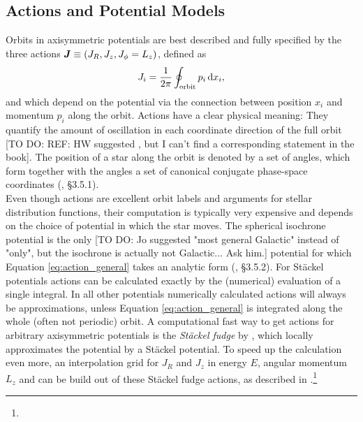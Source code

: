 \subsection{Actions and Potential Models}  \label{sec:potentials}


Orbits in axisymmetric potentials are best described and fully specified by the three actions $\boldsymbol{J} \equiv (J_R, J_z, J_\phi=L_z)$, defined as
\begin{equation}
J_i = \frac{1}{2\pi} \oint_\text{orbit} p_i \mathop{}\!\mathrm{d} x_i, \label{eq:action_general}
\end{equation}
and which depend on the potential via the connection between position $x_i$ and momentum $p_i$ along the orbit. Actions have a clear physical meaning: They quantify the amount of oscillation in each coordinate direction of the full orbit [TO DO: REF: HW suggested \citet{2008gady.book.....B}, but I can't find a corresponding statement in the book]. The position of a star along the orbit is denoted by a set of angles, which form together with the angles a set of canonical conjugate phase-space coordinates (\citealt{2008gady.book.....B}, \S 3.5.1). \\

Even though actions are excellent orbit labels and arguments for stellar distribution functions, their computation is typically very expensive and depends on the choice of potential in which the star moves. The spherical isochrone potential \citep{1959AnAp...22..126H} is the only [TO DO: Jo suggested "most general Galactic" instead of "only", but the isochrone is actually not Galactic... Ask him.] potential for which Equation \ref{eq:action_general} takes an analytic form (\citealt{2008gady.book.....B}, \S 3.5.2). For St\"{a}ckel potentials actions can be calculated exactly by the (numerical) evaluation of a single integral. In all other potentials numerically calculated actions will always be approximations, unless Equation \ref{eq:action_general} is integrated along the whole (often not periodic) orbit.  A computational fast way to get actions for arbitrary axisymmetric potentials is the \emph{St\"{a}ckel fudge} by \citet{2012MNRAS.426.1324B}, which locally approximates the potential by a St\"{a}ckel potential. To speed up the calculation even more, an interpolation grid for $J_R$ and $J_z$ in energy $E$, angular momentum $L_z$ and  can be build out of these St\"{a}ckel fudge actions, as described in \citet{bov15}.\footnote{} \\

